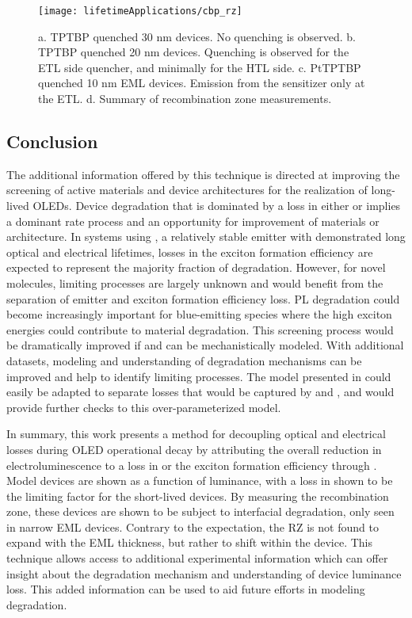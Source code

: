 \documentclass[../thesis.tex]{subfiles}
\begin{document}
\begin{figure}[ht]
\centering
\texttt{[image: lifetimeApplications/cbp\_rz]}
\caption{a. TPTBP quenched 30 nm devices.  No quenching is observed.  b. TPTBP quenched 20 nm devices.  Quenching is observed for the ETL side quencher, and minimally for the HTL side. c. PtTPTBP quenched 10 nm EML devices. Emission from the sensitizer only at the ETL. d. Summary of recombination zone measurements.}
\label{fig:cbp_rz}
\end{figure}

\subsection{Conclusion}

The additional information offered by this technique is directed at improving the screening of active materials and device architectures for the realization of long-lived OLEDs.  
Device degradation that is dominated by a loss in either \ef  or \pl implies a dominant rate process and an opportunity for improvement of materials or architecture.  
In systems using \irppy, a relatively stable emitter with demonstrated long optical and electrical lifetimes,\supercite{Scholz2015} losses in the exciton formation efficiency are expected to represent the majority fraction of degradation.  
However, for novel molecules, limiting processes are largely unknown and would benefit from the separation of emitter and exciton formation efficiency loss.  
PL degradation could become increasingly important for blue-emitting species where the high exciton energies could contribute to material degradation.  \supercite{Scholz2015,Xu2016,Coburn2016a,Lee2015,Yi2016,Kim2008}
This screening process would be dramatically improved if \ef and \pl can be mechanistically modeled.  
With additional datasets, modeling and understanding of degradation mechanisms can be improved and help to identify limiting processes.
The model presented in \textcite{Giebink2008a} could easily be adapted to separate losses that would be captured by \pl and \ef, and would provide further checks to this over-parameterized model.

In summary, this work presents a method for decoupling optical and electrical losses during OLED operational decay by attributing the overall reduction in electroluminescence to a loss in \pl or the exciton formation efficiency through \ef.  
Model devices are shown as a function of luminance, with a loss in \ef shown to be the limiting factor for the short-lived devices.  
By measuring the recombination zone, these devices are shown to be subject to interfacial degradation, only seen in narrow EML devices.
Contrary to the expectation, the RZ is not found to expand with the EML thickness, but rather to shift within the device.
This technique allows access to additional experimental information which can offer insight about the degradation mechanism and understanding of device luminance loss.  
This added information can be used to aid future efforts in modeling degradation.
\end{document}

